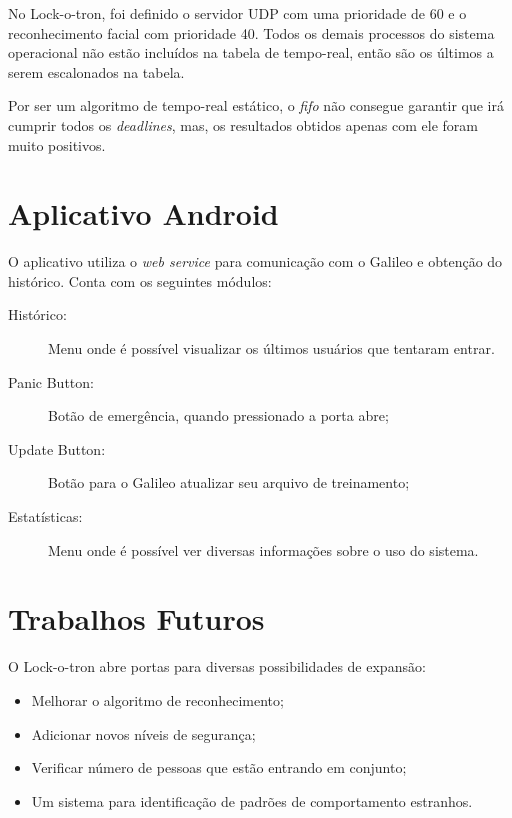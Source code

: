 \documentclass[12pt]{article}
\begin{document}
    No Lock-o-tron, foi definido o servidor UDP com uma prioridade de 60 e o
    reconhecimento facial com prioridade 40. Todos os demais processos do
    sistema operacional não estão incluídos na tabela de tempo-real, então são
    os últimos a serem escalonados na tabela.

    Por ser um algoritmo de tempo-real estático, o \textit{fifo} não consegue
    garantir que irá cumprir todos os \textit{deadlines}, mas, os resultados
    obtidos apenas com ele foram muito positivos.

\section{Aplicativo Android}
    O aplicativo utiliza o \textit{web service} para comunicação com o Galileo e
    obtenção do histórico. Conta com os seguintes módulos:
    \begin{description}
        \item[Histórico:] Menu onde é possível visualizar os últimos usuários que
        tentaram entrar.
        \item[Panic Button:] Botão de emergência, quando pressionado a porta
        abre;
        \item[Update Button:] Botão para o Galileo atualizar seu arquivo de
        treinamento;
        \item[Estatísticas:] Menu onde é possível ver diversas informações sobre
        o uso do sistema.
    \end{description}


\section{Trabalhos Futuros}
    O Lock-o-tron abre portas para diversas possibilidades de expansão:
    \begin{itemize}
        \item Melhorar o algoritmo de reconhecimento;
        \item Adicionar novos níveis de segurança;
        \item Verificar número de pessoas que estão entrando em conjunto;
        \item Um sistema para identificação de padrões de comportamento estranhos.
    \end{itemize}
\end{document}

